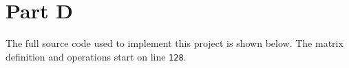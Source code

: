 \documentclass[12pt]{article}
\begin{document}
\newpage
\section*{Part D}
The full source code used to implement this project is shown below. The matrix
definition and operations start on line \texttt{128}.


\newpage




\end{document}

